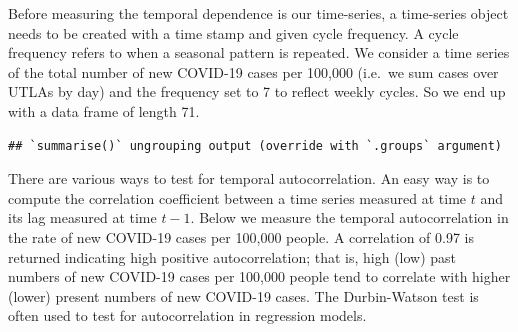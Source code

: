 \documentclass[
]{book}
\newenvironment{Shaded}{\begin{snugshade}}{\end{snugshade}}
\newcommand{\CommentTok}[1]{\textcolor[rgb]{0.56,0.35,0.01}{\textit{#1}}}
\newcommand{\DataTypeTok}[1]{\textcolor[rgb]{0.13,0.29,0.53}{#1}}
\newcommand{\DecValTok}[1]{\textcolor[rgb]{0.00,0.00,0.81}{#1}}
\newcommand{\KeywordTok}[1]{\textcolor[rgb]{0.13,0.29,0.53}{\textbf{#1}}}
\newcommand{\NormalTok}[1]{#1}
\newcommand{\OperatorTok}[1]{\textcolor[rgb]{0.81,0.36,0.00}{\textbf{#1}}}
\newcommand{\StringTok}[1]{\textcolor[rgb]{0.31,0.60,0.02}{#1}}
\begin{document}
Before measuring the temporal dependence is our time-series, a time-series object needs to be created with a time stamp and given cycle frequency. A cycle frequency refers to when a seasonal pattern is repeated. We consider a time series of the total number of new COVID-19 cases per 100,000 (i.e.~we sum cases over UTLAs by day) and the frequency set to 7 to reflect weekly cycles. So we end up with a data frame of length 71.

\begin{Shaded}
\end{Shaded}

\begin{verbatim}
## `summarise()` ungrouping output (override with `.groups` argument)
\end{verbatim}

\begin{Shaded}
\end{Shaded}

There are various ways to test for temporal autocorrelation. An easy way is to compute the correlation coefficient between a time series measured at time \(t\) and its lag measured at time \(t-1\). Below we measure the temporal autocorrelation in the rate of new COVID-19 cases per 100,000 people. A correlation of 0.97 is returned indicating high positive autocorrelation; that is, high (low) past numbers of new COVID-19 cases per 100,000 people tend to correlate with higher (lower) present numbers of new COVID-19 cases. The Durbin-Watson test is often used to test for autocorrelation in regression models.

\begin{Shaded}
\end{Shaded}
\end{document}

